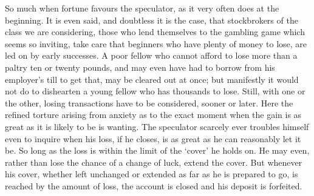 \documentclass[letterpaper,12pt,oneside,openany]{memoir}
\begin{document}
So much when fortune favours the speculator, as it
very often does at the beginning. It is even said, and
doubtless it is the case, that stockbrokers of the class we
are considering, those who lend themselves to the gambling
game which seems so inviting, take care that
beginners who have plenty of money to lose, are led on
by early successes. A poor fellow who cannot afford
to lose more than a paltry ten or twenty pounds, and
may even have had to borrow from his employer's till to
get that, may be cleared out at once; but manifestly it
would not do to dishearten a young fellow who has
thousands to lose. Still, with one or the other, losing
transactions have to be considered, sooner or later.
Here the refined torture arising from anxiety as to the
exact moment when the gain is as great as it is likely to
be is wanting. The speculator scarcely ever troubles
himself even to inquire when his loss, if he closes, is as
great as he can reasonably let it be. So long as the loss
is within the limit of the `cover' he holds on. He may
even, rather than lose the chance of a change of luck,
extend the cover. But whenever his cover, whether left
unchanged or extended as far as he is prepared to go, is
reached by the amount of loss, the account is closed and
his deposit is forfeited.
\end{document}
